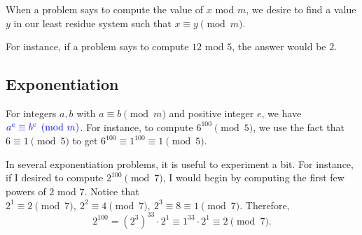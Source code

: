 When a problem says to compute the value of $x$ mod $m$, we desire to find a value $y$ in our least residue system such that $x\equiv y\pmod{m}$. 

For instance, if a problem says to compute $12$ mod $5$, the answer would be $2$.

\clearpage

\subsection{Exponentiation}
For integers $a, b$ with $a\equiv b\pmod{m}$ and positive integer $e$, we have $\color{blue} a^{e}\equiv b^{e}\pmod{m}\color{black}$. For instance, to compute $6^{100}\pmod{5}$, we use the fact that $6\equiv 1\pmod{5}$ to get $6^{100}\equiv 1^{100}\equiv 1\pmod{5}.$ 
	
In several exponentiation problems, it is useful to experiment a bit. For instance, if I desired to compute $2^{100}\pmod{7}$, I would begin by computing the first few powers of $2$ mod $7$. Notice that $2^1\equiv 2\pmod{7},\: 2^2\equiv 4\pmod{7},\: 2^3\equiv 8\equiv 1\pmod{7}.$ Therefore, $$2^{100}=\left(2^3\right)^{33}\cdot 2^1\equiv 1^{33}\cdot 2^1\equiv 2\pmod{7}.$$

\clearpage
{}

